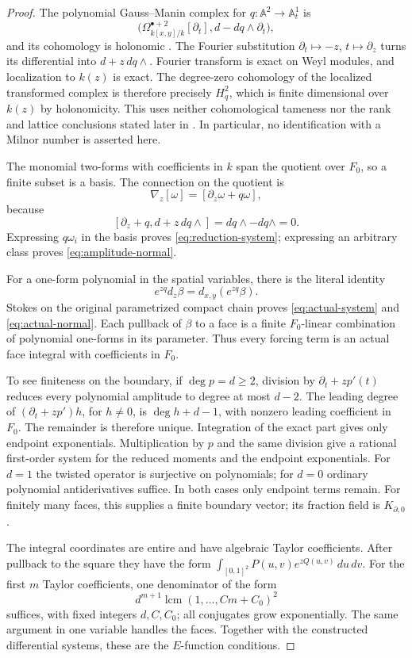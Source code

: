 \documentclass[11pt]{article}
\numberwithin{equation}{section}
\theoremstyle{definition}
\theoremstyle{remark}
\newcommand{\dd}{\,d}
\newcommand{\Hq}{H_q^2}
\newcommand{\A}{\mathbb A}
\begin{document}
\begin{proof}
The polynomial Gauss--Manin complex for $q:\A^2\to\A^1_t$ is
\[
 \bigl(\Omega^{\bullet+2}_{k[x,y]/k}[\partial_t],
             d-dq\wedge\partial_t\bigr),
\]
and its cohomology is holonomic \cite[Proposition~9.1]{Sabbah}.
The Fourier substitution $\partial_t\mapsto-z$, $t\mapsto\partial_z$
turns its differential into $d+z\,dq\wedge$. Fourier transform is exact
on Weyl modules, and localization to $k(z)$ is exact. The degree-zero
cohomology of the localized transformed complex is therefore precisely
$\Hq$, which is finite dimensional over $k(z)$ by holonomicity.
This uses neither cohomological tameness nor the rank and lattice
conclusions stated later in \cite{Sabbah}. In particular, no identification
with a Milnor number is asserted here.

The monomial two-forms with coefficients in $k$ span the quotient over
$F_0$, so a finite subset is a basis. The connection on the quotient is
\[
 \nabla_z[\omega]=[\partial_z\omega+q\omega],
\]
because
\[
 [\partial_z+q,d+z\,dq\wedge]
 =dq\wedge-dq\wedge=0.
\]
Expressing $q\omega_i$ in the basis proves \eqref{eq:reduction-system};
expressing an arbitrary class proves \eqref{eq:amplitude-normal}.

For a one-form polynomial in the spatial variables, there is the literal
identity
\[
 e^{zq}d_z\beta=d_{x,y}(e^{zq}\beta).
\]
Stokes on the original parametrized compact chain proves
\eqref{eq:actual-system} and \eqref{eq:actual-normal}. Each pullback of
$\beta$ to a face is a finite $F_0$-linear combination of polynomial
one-forms in its parameter. Thus every forcing term is an actual face
integral with coefficients in $F_0$.

To see finiteness on the boundary, if $\deg p=d\ge2$, division by
$\partial_t+zp'(t)$ reduces every polynomial amplitude to degree at most
$d-2$. The leading degree of $(\partial_t+zp')h$, for $h\ne0$, is
$\deg h+d-1$, with nonzero leading coefficient in $F_0$. The remainder is
therefore unique. Integration of the exact part gives only endpoint
exponentials. Multiplication by $p$ and the same division give a rational
first-order system for the reduced moments and the endpoint exponentials.
For $d=1$ the twisted operator is surjective on polynomials; for $d=0$ ordinary polynomial antiderivatives suffice. In both cases only endpoint terms remain.
For finitely many faces, this supplies a finite boundary vector; its
fraction field is $K_{\partial,0}$.

The integral coordinates are entire and have algebraic Taylor coefficients.
After pullback to the square they have the form
$\int_{[0,1]^2}P(u,v)e^{zQ(u,v)}\dd u\dd v$. For the first $m$ Taylor
coefficients, one denominator of the form
\[
 d^{m+1}\operatorname{lcm}(1,\ldots,Cm+C_0)^2
\]
suffices, with fixed integers $d,C,C_0$; all conjugates grow exponentially.
The same argument in one variable handles the faces. Together with the
constructed differential systems, these are the $E$-function conditions.
\end{proof}
\end{document}

